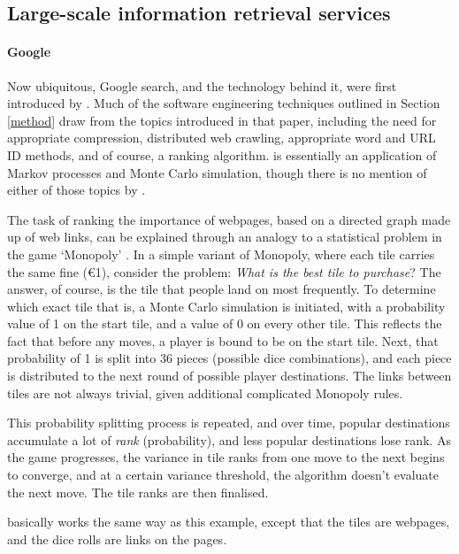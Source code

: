 \subsection{Large-scale information retrieval services}
\paragraph{Google} Now ubiquitous, Google search, and the technology behind it, were first introduced by .  Much of the software
engineering techniques outlined in Section \ref{method} draw
from the topics introduced in that paper, including the need
for appropriate compression, distributed web crawling, appropriate word and
URL ID methods, and of course, a ranking algorithm.  \pr{}
is essentially an application of Markov processes and Monte
Carlo simulation, though there is no mention of
either of those topics by .

The task of ranking the importance of webpages, based on a directed graph
made
up of web links, can be explained through an analogy to a statistical
problem in the
game `Monopoly' \cite{euler84}.  In a simple variant of Monopoly, where each tile carries
the same fine (€1), consider the problem: {\it What is the best tile to
purchase}?  The answer, of course, is the tile that people land on most
frequently. To determine which exact tile that is, a Monte Carlo simulation
is initiated, with a probability value of 1 on the start tile, and a
value of 0 on every other tile.  This reflects the fact that before any
moves, a player is bound to be on the start tile.  Next, that probability of 1 is split into 36 pieces (possible dice combinations), and each piece is distributed to the next round of possible player destinations.
The links between tiles are not always trivial, given additional
complicated Monopoly rules.

This probability splitting process is repeated, and over time,
popular destinations accumulate a lot of {\it rank} (probability),
and less popular destinations lose rank.  As the
game progresses, the variance in tile ranks from one move to the next 
begins to converge, and at a certain variance threshold, the
algorithm doesn't evaluate the next move.  The tile ranks are then
finalised.

\pr{} basically works the same way as this example, except that the
tiles are webpages, and the dice rolls are links on the pages.